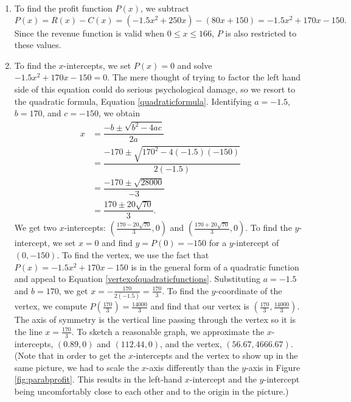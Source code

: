 {
\begin{enumerate}

\item  To find the profit function $P(x)$, we subtract \[P(x) = R(x) - C(x) = \left(-1.5x^2+250x\right) - \left(80x + 150\right) = -1.5x^2+170x-150.\]  Since the revenue function is valid when $0 \leq x \leq 166$, $P$ is also restricted to these values. 

\item  To find the $x$-intercepts, we set $P(x) = 0$ and solve  $-1.5x^2+170x-150=0$. The mere thought of trying to factor the left hand side of this equation could do serious psychological damage, so we resort to the quadratic formula, Equation \ref{quadraticformula}.  Identifying $a = -1.5$, $b=170$, and $c=-150$, we obtain
\begin{align*}
	x & = \dfrac{-b \pm \sqrt{b^2-4ac}}{2a} \\
	  & = \dfrac{-170 \pm \sqrt{170^2 - 4(-1.5)(-150)}}{2(-1.5)}\\
	  & = \dfrac{-170 \pm \sqrt{28000}}{-3}\\
	  & = \dfrac{170 \pm 20 \sqrt{70}}{3}.
\end{align*}
We get two $x$-intercepts: $\left( \frac{170 - 20 \sqrt{70}}{3},0\right)$ and $\left( \frac{170 + 20 \sqrt{70}}{3},0\right)$.  To find the $y$-intercept, we set $x=0$ and find $y=P(0)=-150$ for a $y$-intercept of $(0,-150)$.  To find the vertex, we use the fact that $P(x)=-1.5x^2+170x-150$ is in the general form of a quadratic function and appeal to Equation \ref{vertexofquadraticfunctions}.  Substituting $a = -1.5$ and $b=170$, we get $x = -\frac{170}{2(-1.5)} = \frac{170}{3}$.  To find the $y$-coordinate of the vertex, we compute $P\left( \frac{170}{3} \right) = \frac{14000}{3}$ and find that our vertex is $\left(\frac{170}{3}, \frac{14000}{3}\right)$.  The axis of symmetry is the vertical line passing through the vertex so it is the line $x=\frac{170}{3}$.  To sketch a reasonable graph, we approximate the $x$-intercepts,  $(0.89,0)$ and $(112.44,0)$, and the vertex, $(56.67,4666.67)$.  (Note that in order to get the $x$-intercepts and the vertex to show up in the same picture, we had to scale the $x$-axis differently than the $y$-axis in Figure \ref{fig:parabprofit}.  This results in the left-hand $x$-intercept and the $y$-intercept being uncomfortably close to each other and to the origin in the picture.)




\end{enumerate}}
